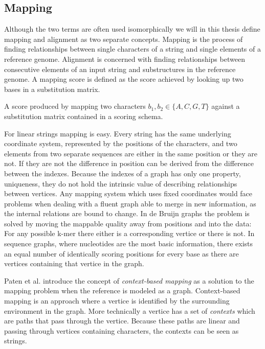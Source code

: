 \documentclass[thesis.tex]{subfiles}
\begin{document}
\subsection{Mapping}
Although the two terms are often used isomorphically we will in this thesis define mapping and alignment as two separate concepts. Mapping is the process of finding relationships between single characters of a string and single elements of a reference genome. Alignment is concerned with finding relationships between consecutive elements of an input string and substructures in the reference genome. A mapping score is defined as the score achieved by looking up two bases in a substitution matrix.  
\begin{defn}
  A score produced by mapping two characters $b_1, b_2 \in \{A, C, G, T\}$ against a substitution matrix contained in a scoring schema.
\end{defn}
\noindent
For linear strings mapping is easy. Every string has the same underlying coordinate system, represented by the positions of the characters, and two elements from two separate sequences are either in the same position or they are not. If they are not the difference in position can be derived from the difference between the indexes. Because the indexes of a graph has only one property, uniqueness, they do not hold the intrinsic value of describing relationships between vertices. Any mapping system which uses fixed coordinates would face problems when dealing with a fluent graph able to merge in new information, as the internal relations are bound to change. In de Bruijn graphs the problem is solved by moving the mappable quality away from positions and into the data: For any possible k-mer there either is a corresponding vertice or there is not. In sequence graphs, where nucleotides are the most basic information, there exists an equal number of identically scoring positions for every base as there are vertices containing that vertice in the graph.\\
\par\noindent
Paten et al.\cite{mapping_to_a_reference_genome_structure} introduce the concept of \textit{context-based mapping} as a solution to the mapping problem when the reference is modeled as a graph. Context-based mapping is an approach where a vertice is identified by the surrounding environment in the graph. More technically a vertice has a set of \textit{contexts} which are paths that pass through the vertice. Because these paths are linear and passing through vertices containing characters, the contexts can be seen as strings. 
\end{document}
